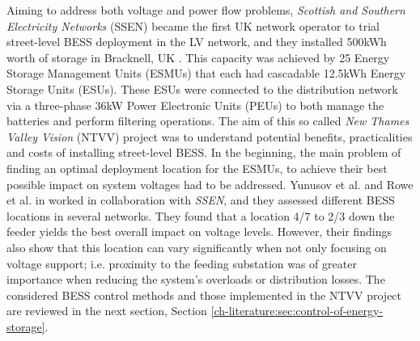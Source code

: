 Aiming to address both voltage and power flow problems, \textit{Scottish and Southern Electricity Networks} (SSEN) became the first UK network operator to trial street-level BESS deployment in the LV network, and they installed 500kWh worth of storage in Bracknell, UK \cite{SSEN2016}.
This capacity was achieved by 25 Energy Storage Management Units (ESMUs) that each had cascadable 12.5kWh Energy Storage Units (ESUs).
These ESUs were connected to the distribution network via a three-phase 36kW Power Electronic Units (PEUs) to both manage the batteries and perform filtering operations.
The aim of this so called \textit{New Thames Valley Vision} (NTVV) project was to understand potential benefits, practicalities and costs of installing street-level BESS.
In the beginning, the main problem of finding an optimal deployment location for the ESMUs, to achieve their best possible impact on system voltages had to be addressed.
Yunusov et al. and Rowe et al. in \cite{Yunusov2016, Rowe2014, Rowe2014a} worked in collaboration with \textit{SSEN}, and they assessed different BESS locations in several networks.
They found that a location 4/7 to 2/3 down the feeder yields the best overall impact on voltage levels.
However, their findings also show that this location can vary significantly when not only focusing on voltage support; i.e. proximity to the feeding substation was of greater importance when reducing the system's overloads or distribution losses.
The considered BESS control methods and those implemented in the NTVV project are reviewed in the next section, Section \ref{ch-literature:sec:control-of-energy-storage}.








